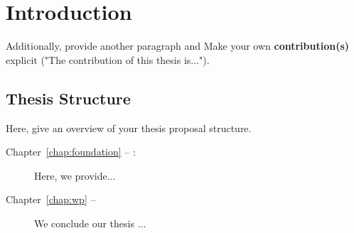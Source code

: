 
\chapter{Introduction}

Additionally, provide  another paragraph and  Make your own \textbf{contribution(s)} explicit ("The contribution of this thesis is...").


\section*{Thesis Structure}
Here, give an overview of your thesis proposal structure.
\begin{description}
	\item[Chapter~\ref{chap:foundation} -- :] Here, we provide...
	\item[Chapter~\ref{chap:wp} -- ] We conclude our thesis ...
\end{description}






